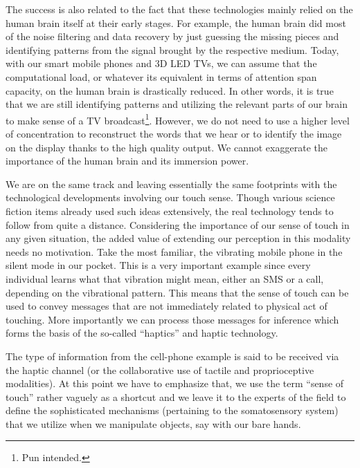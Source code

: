 The success is also related to the fact that these technologies mainly relied on the human brain itself at their early stages. For 
example, the human brain did most of the noise filtering and data recovery by just guessing the missing pieces and identifying patterns 
from the signal brought by the respective medium. Today, with our smart mobile phones and 3D LED TVs, we can assume that the 
computational load, or whatever its equivalent in terms of attention span capacity, on the human brain is drastically reduced. In other 
words, it is true that we are still identifying patterns and utilizing the relevant parts of our brain to make sense of a TV broadcast\footnote{Pun 
intended.}. However, we do not need to use a higher level of concentration to reconstruct the words that we hear or to identify the image 
on the display thanks to the high quality output. We cannot exaggerate the importance of the human brain and its immersion power. 

We are on the same track and leaving essentially the same footprints with the technological developments involving our touch sense. 
Though various science fiction items already used such ideas extensively, the real technology tends to follow from quite a distance.  
Considering the importance of our sense of touch in any given situation, the added value of extending our perception in this modality 
needs no motivation. Take the most familiar, the vibrating mobile phone in the silent mode in our pocket. This is a very important 
example since every individual learns what that vibration might mean, either an SMS or a call, depending on the vibrational pattern. This 
means that the sense of touch can be used to convey messages that are not immediately related to physical act of touching. More 
importantly we can process those messages for inference which forms the basis of the so-called \enquote{haptics} and haptic technology.


The type of information from the cell-phone example is said to be received via the haptic channel (or the collaborative use of tactile 
and proprioceptive modalities). At this point we have to emphasize that, we use the term \enquote{sense of touch} rather vaguely as a 
shortcut and we leave it to the experts of the field to define the sophisticated mechanisms (pertaining to the somatosensory system) that 
we utilize when we manipulate objects, say with our bare hands. 


